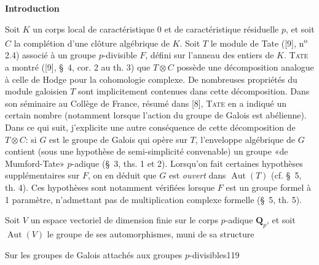 \begin{center}\textbf{Introduction}\end{center}

Soit $K$ un corps local de caractéristique 0 et de caractéristique résiduelle $p$, et soit $C$ la complétion d'une clôture algébrique de $K$. Soit $T$ le module de Tate ([9], n\textsuperscript{o} 2.4) associé à un groupe $p$-divisible $F$, défini sur l'anneau des entiers de $K$. \textsc{Tate} a montré ([9], \S\ 4, cor. 2 au th. 3) que $T\otimes C$ possède une décomposition analogue à celle de Hodge pour la cohomologie complexe. De nombreuses propriétés du module galoisien $T$ sont implicitement contenues dans cette décomposition. Dans son séminaire au Collège de France, résumé dans [8], \textsc{Tate} en a indiqué un certain nombre (notamment lorsque l'action du groupe de Galois est abélienne). Dans ce qui suit, j'explicite une autre conséquence de cette décomposition de $T\otimes C$: si $G$ est le groupe de Galois qui opère sur $T$, l'enveloppe algébrique de $G$ contient (sous une hypothèse de semi-simplicité convenable) un groupe «de Mumford-Tate» $p$-adique (\S\ 3, ths. 1 et 2). Lorsqu'on fait certaines hypothèses supplémentaires sur $F$, on en déduit que $G$ est \textit{ouvert} dans $\operatorname{Aut}(T)$ (cf. \S\ 5, th. 4). Ces hypothèses sont notamment vérifiées lorsque $F$ est un groupe formel à 1 paramètre, n'admettant pas de multiplication complexe formelle (\S\ 5, th. 5).


Soit $V$ un espace vectoriel de dimension finie sur le corps $p$-adique $\mathbf Q_p$, et soit $\operatorname{Aut}(V)$ le groupe de ses automorphismes, muni de sa structure


\begin{center}Sur les groupes de Galois attachés aux groupes $p$-divisibles\hfill119\end{center}

